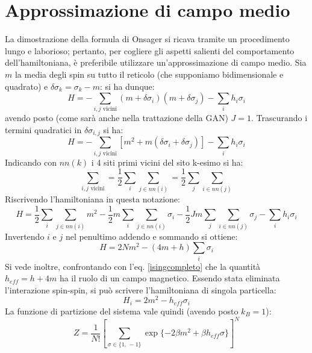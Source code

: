 \documentclass[Lau, noexaminfo, oneside]{sapthesis} %
\begin{document}
\section{Approssimazione di campo medio}
La dimostrazione della formula di Onsager si ricava tramite un procedimento lungo e laborioso; pertanto, per cogliere gli aspetti salienti del comportamento dell'hamiltoniana, è preferibile utilizzare un'approssimazione di campo medio\cite{meanfield}. Sia $m$ la media degli spin su tutto il reticolo (che supponiamo bidimensionale e quadrato) e $\delta\sigma_k = \sigma_k - m$: si ha dunque:
\begin{equation}
H = -\sum_{i,j \text{ vicini}}  (m + \delta\sigma_i)(m + \delta\sigma_j) - \sum_i h_i \sigma_i 
\end{equation}
avendo posto (come sarà anche nella trattazione della GAN) $J=1$.
Trascurando i termini quadratici in $\delta\sigma_{i,j}$ si ha:
\begin{equation}
H = - \sum_{i,j \text{ vicini}}  [m^2 + m (\delta\sigma_i + \delta\sigma_j)] - \sum_i h_i \sigma_i 
\end{equation}
Indicando con $nn(k)$ i 4 siti primi vicini del sito k-esimo si ha:
\begin{equation}
\sum_{i,j \text{ vicini}} = \frac{1}{2} \sum_i \sum_{j\in nn(i)} = \frac{1}{2} \sum_j \sum_{i\in nn(j)}
\end{equation}
Riscrivendo l'hamiltoniana in questa notazione:
\begin{equation}
H = \frac{1}{2} \sum_i \sum_{j\in nn(i)} m^2 - \frac{1}{2}m \sum_i \sum_{j\in nn(i)} \sigma_i - \frac{1}{2}Jm \sum_j \sum_{i\in nn(j)} \sigma_j - \sum_i h_i \sigma_i 
\end{equation}
Invertendo $i$ e $j$ nel penultimo addendo e sommando si ottiene:
\begin{equation}
H = 2 N m^2 - (4 m+h) \sum_i \sigma_i
\end{equation}
Si vede inoltre, confrontando con l'eq. \eqref{isingcompleto} che la quantità $h_{eff} = h+4m$ ha il ruolo di un campo magnetico.
Essendo stata eliminata l'interazione spin-spin, si può scrivere l'hamiltoniana di singola particella:
\begin{equation}
H_i =  2  m^2 - h_{eff} \sigma_i
\label{hamiltonianasingola}
\end{equation}
La funzione di partizione del sistema vale quindi (avendo posto $k_{B} = 1$):
\begin{equation}
Z = \frac{1}{N!} \left [ \sum_{\sigma \in \lbrace{1,\,-1}\rbrace} \exp \lbrace -2 \beta m^2 +  \beta h_{eff} \sigma \rbrace \right ] ^N
\end{equation}
\end{document}
